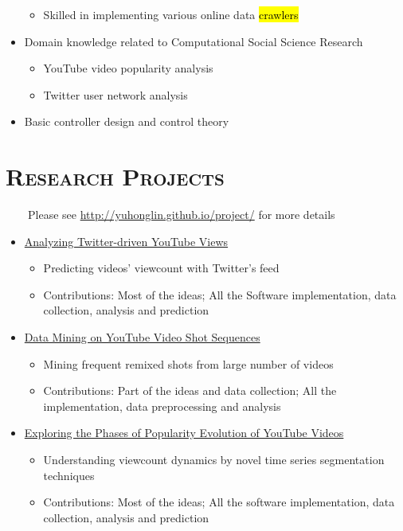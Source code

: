 \begin{resume}
\begin{itemize}
  \begin{itemize}
    \item Skilled in implementing various online data \hl{crawlers}
    \end{itemize}
\item Domain knowledge related to Computational Social Science Research
  \begin{itemize}
  \item YouTube video popularity analysis
  \item Twitter user network analysis
  \end{itemize}
\item  Basic controller design and control theory
\end{itemize}


\section{\textsc{Research Projects}}
\ \ \ \  Please see \href{http://yuhonglin.github.io/project/}{http://yuhonglin.github.io/project/} for more details \\
\begin{itemize}
\item \href{http://yuhonglin.github.io/2013/10/02/youtube-and-twitter.html}{Analyzing Twitter-driven YouTube Views}
  \begin{itemize}
  \item Predicting videos' viewcount with Twitter's feed %
  \item Contributions: Most of the ideas; All the Software implementation, data collection, analysis and prediction
  \end{itemize}
\item \href{http://yuhonglin.github.io/2014/08/31/visual-meme-sequence-analysis.html}{Data Mining on YouTube Video Shot Sequences}
  \begin{itemize}
  \item Mining frequent remixed shots from large number of videos
  \item Contributions: Part of the ideas and data collection; All the implementation, data preprocessing and analysis
  \end{itemize}
\item \href{http://yuhonglin.github.io/2012/10/04/viewcount-phase.html}{Exploring the Phases of Popularity Evolution of YouTube Videos}
  \begin{itemize}
  \item Understanding viewcount dynamics by novel time series segmentation techniques
  \item Contributions: Most of the ideas; All the software implementation, data collection, analysis and prediction
  \end{itemize}    
\end{itemize}


\end{resume}
